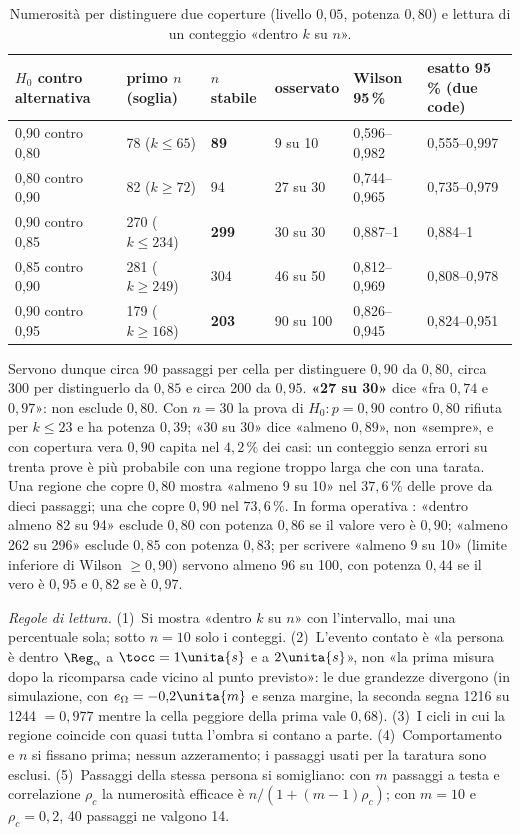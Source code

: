 \begin{table}[H]\centering\footnotesize
\caption{Numerosità per distinguere due coperture (livello $0{,}05$, potenza $0{,}80$) e lettura di un conteggio «dentro $k$ su $n$». }\label{tab:val-numerosita}
\begin{tabular}{@{}lll@{\hspace{2.2em}}lll@{}}
\toprule
$H_0$ contro alternativa & primo $n$ (soglia) & $n$ stabile & osservato & Wilson 95\,\% & esatto 95\,\% (due code)\\
\midrule
0,90 contro 0,80 & 78 ($k\le65$) & \textbf{89} & 9 su 10 & 0,596–0,982 & 0,555–0,997\\
0,80 contro 0,90 & 82 ($k\ge72$) & 94 & 27 su 30 & 0,744–0,965 & 0,735–0,979\\
0,90 contro 0,85 & 270 ($k\le234$) & \textbf{299} & 30 su 30 & 0,887–1 & 0,884–1\\
0,85 contro 0,90 & 281 ($k\ge249$) & 304 & 46 su 50 & 0,812–0,969 & 0,808–0,978\\
0,90 contro 0,95 & 179 ($k\ge168$) & \textbf{203} & 90 su 100 & 0,826–0,945 & 0,824–0,951\\
\bottomrule
\end{tabular}
\end{table}

Servono dunque circa 90 passaggi per cella per distinguere $0{,}90$ da $0{,}80$, circa 300 per distinguerlo da $0{,}85$ e circa 200 da $0{,}95$. \textbf{«27 su 30»} dice «fra $0{,}74$ e $0{,}97$»: non esclude $0{,}80$. Con $n=30$ la prova di $H_0\colon p=0{,}90$ contro $0{,}80$ rifiuta per $k\le23$ e ha potenza $0{,}39$; «30 su 30» dice «almeno $0{,}89$», non «sempre», e con copertura vera $0{,}90$ capita nel $4{,}2\,\%$ dei casi: un conteggio senza errori su trenta prove è più probabile con una regione troppo larga che con una tarata. Una regione che copre $0{,}80$ mostra «almeno 9 su 10» nel $37{,}6\,\%$ delle prove da dieci passaggi; una che copre $0{,}90$ nel $73{,}6\,\%$. In forma operativa : «dentro almeno 82 su 94» esclude $0{,}80$ con potenza $0{,}86$ se il valore vero è $0{,}90$; «almeno 262 su 296» esclude $0{,}85$ con potenza $0{,}83$; per scrivere «almeno 9 su 10» (limite inferiore di Wilson $\ge0{,}90$) servono almeno 96 su 100, con potenza $0{,}44$ se il vero è $0{,}95$ e $0{,}82$ se è $0{,}97$.

\emph{Regole di lettura.} (1)~Si mostra «dentro $k$ su $n$» con l'intervallo, mai una percentuale sola; sotto $n=10$ solo i conteggi. (2)~L'evento contato è «la persona è dentro $\Reg_\alpha$ a $\tocc=1\unita{s}$ e a $2\unita{s}$», non «la prima misura dopo la ricomparsa cade vicino al punto previsto»: le due grandezze divergono (in simulazione, con $e_\Omega=-0{,}2\unita{m}$ e senza margine, la seconda segna 1216 su 1244 $=0{,}977$ mentre la cella peggiore della prima vale $0{,}68$). (3)~I cicli in cui la regione coincide con quasi tutta l'ombra si contano a parte. (4)~Comportamento e $n$ si fissano prima; nessun azzeramento; i passaggi usati per la taratura sono esclusi. (5)~Passaggi della stessa persona si somigliano: con $m$ passaggi a testa e correlazione $\rho_c$ la numerosità efficace è $n/(1+(m-1)\rho_c)$; con $m=10$ e $\rho_c=0{,}2$, 40 passaggi ne valgono 14.

